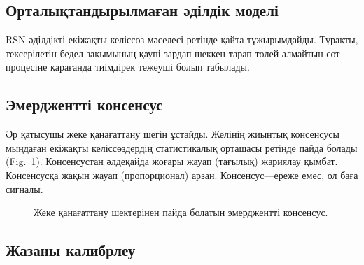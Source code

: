 \documentclass[11pt,a4paper,twocolumn]{article}
\begin{document}
\subsection{Орталықтандырылмаған әділдік моделі}

RSN әділдікті екіжақты келіссөз мәселесі ретінде қайта тұжырымдайды. Тұрақты, тексерілетін бедел зақымының қаупі зардап шеккен тарап төлей алмайтын сот процесіне қарағанда тиімдірек тежеуші болып табылады.

\subsection{Эмерджентті консенсус}

Әр қатысушы жеке қанағаттану шегін ұстайды. Желінің жиынтық консенсусы мыңдаған екіжақты келіссөздердің статистикалық орташасы ретінде пайда болады (Fig.~\ref{fig:consensus}). Консенсустан әлдеқайда жоғары жауап (тағылық) жариялау қымбат. Консенсусқа жақын жауап (пропорционал) арзан. Консенсус---ереже емес, ол баға сигналы.

\begin{figure}[ht]
\centering
{}
\caption{Жеке қанағаттану шектерінен пайда болатын эмерджентті консенсус.}
\label{fig:consensus}
\end{figure}

\subsection{Жазаны калибрлеу}
\end{document}
